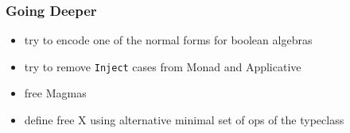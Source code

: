 \documentclass{beamer}
\begin{document}
\begin{frame}
  \frametitle{Going Deeper}
  \begin{itemize}
  \item try to encode one of the normal forms for boolean algebras
  \item try to remove \texttt{Inject} cases from Monad and Applicative
  \item free Magmas
  \item define free X using alternative minimal set of ops of the typeclass
  \end{itemize}
\end{frame}
\end{document}
